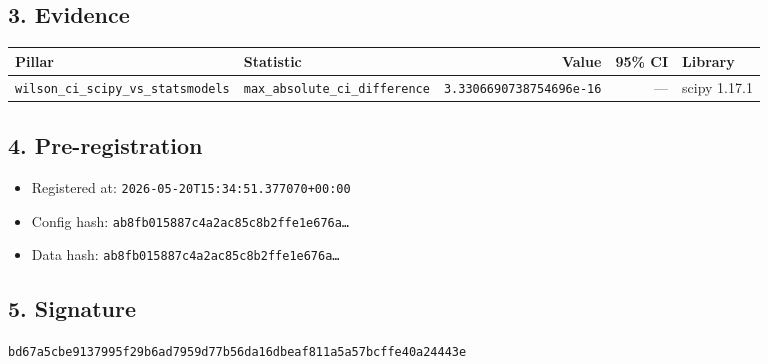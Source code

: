 \documentclass{article}
\begin{document}
\subsection*{3. Evidence}
\begin{tabular}{llrrl}\toprule
\textbf{Pillar} & \textbf{Statistic} & \textbf{Value} & \textbf{95\% CI} & \textbf{Library} \\\midrule
\texttt{wilson\_ci\_scipy\_vs\_statsmodels} & \texttt{max\_absolute\_ci\_difference} & \texttt{3.3306690738754696e-16} & --- & scipy 1.17.1 \\
\bottomrule\end{tabular}
\subsection*{4. Pre-registration}
\begin{itemize}
\item Registered at: \texttt{2026-05-20T15:34:51.377070+00:00}
\item Config hash: \texttt{ab8fb015887c4a2ac85c8b2ffe1e676a\dots}
\item Data hash: \texttt{ab8fb015887c4a2ac85c8b2ffe1e676a\dots}
\end{itemize}
\subsection*{5. Signature}
\texttt{bd67a5cbe9137995f29b6ad7959d77b56da16dbeaf811a5a57bcffe40a24443e}\\
\end{document}
